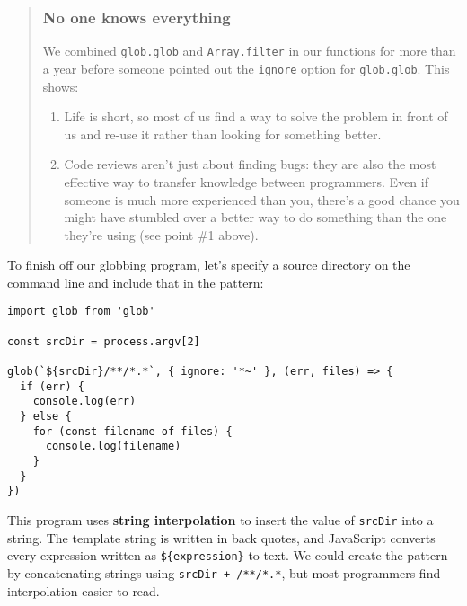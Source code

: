 \documentclass[krantzl]{krantz}
\newcommand{\glossref}[1]{\textbf{#1}}
\newenvironment{callout}{\savenotes\begin{tBox}\begin{quotation}\toggletrue{inbox}\renewcommand{\thempfootnote}{\arabic{footnote}}}{\end{quotation}\vspace{\baselineskip}\end{tBox}\togglefalse{inbox}\spewnotes}
\begin{document}
\begin{callout}


\subsubsection*{No one knows everything}


We combined \texttt{glob.glob} and \texttt{Array.filter} in our functions for more than a year
before someone pointed out the \texttt{ignore} option for \texttt{glob.glob}.
This shows:

\begin{enumerate}

\item 

Life is short,
    so most of us find a way to solve the problem in front of us
    and re-use it rather than looking for something better.



\item 

Code reviews aren't just about finding bugs:
    they are also the most effective way to transfer knowledge between programmers.
    Even if someone is much more experienced than you,
    there's a good chance you might have stumbled over a better way to do something
    than the one they're using (see point \#1 above).



\end{enumerate}

\end{callout}


To finish off our globbing program,
let's specify a source directory on the command line and include that in the pattern:


\begin{lstlisting}[frame=single,frameround=tttt]
import glob from 'glob'

const srcDir = process.argv[2]

glob(`${srcDir}/**/*.*`, { ignore: '*~' }, (err, files) => {
  if (err) {
    console.log(err)
  } else {
    for (const filename of files) {
      console.log(filename)
    }
  }
})
\end{lstlisting}



\noindent This program uses \glossref{string interpolation}
to insert the value of \texttt{srcDir} into a string.
The template string is written in back quotes,
and JavaScript converts every expression written as \texttt{\$\{expression\}} to text.
We could create the pattern by concatenating strings using
\texttt{srcDir + {\textquotesingle}/**/*.*{\textquotesingle}},
but most programmers find interpolation easier to read.
\end{document}
